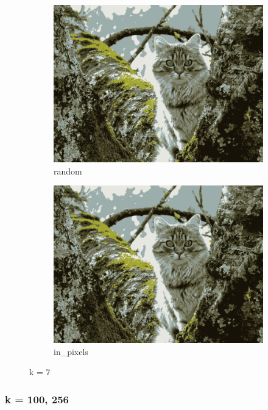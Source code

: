 \documentclass{article}
\begin{document}
\begin{figure}[h!]
  \begin{subfigure}{.5\textwidth}
    \centering
    \includegraphics[width=.8\linewidth]{image/random_7.png}
    \caption{random}
    \label{fig:sfig5}
  \end{subfigure}%
  \begin{subfigure}{.5\textwidth}
    \centering
    \includegraphics[width=.8\linewidth]{image/in_7.png}
    \caption{in\_pixels}
    \label{fig:sfig6}
  \end{subfigure}
  \caption{k = 7}
  \label{fig:fig2}
\end{figure}

\pagebreak
\subsubsection{k = 100, 256}
\end{document}
